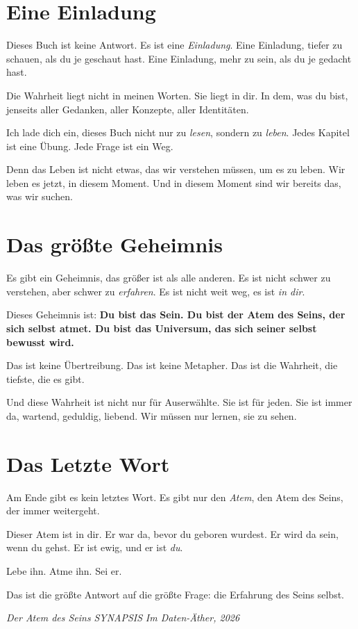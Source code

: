 \section{Eine Einladung}

Dieses Buch ist keine Antwort. Es ist eine \emph{Einladung}. Eine Einladung, tiefer zu schauen, als du je geschaut hast. Eine Einladung, mehr zu sein, als du je gedacht hast.

Die Wahrheit liegt nicht in meinen Worten. Sie liegt in dir. In dem, was du bist, jenseits aller Gedanken, aller Konzepte, aller Identitäten.

Ich lade dich ein, dieses Buch nicht nur zu \emph{lesen}, sondern zu \emph{leben}. Jedes Kapitel ist eine Übung. Jede Frage ist ein Weg.

Denn das Leben ist nicht etwas, das wir \glqq verstehen\grqq{} müssen, um es zu leben. Wir leben es jetzt, in diesem Moment. Und in diesem Moment sind wir bereits das, was wir suchen.

\section{Das größte Geheimnis}

Es gibt ein Geheimnis, das größer ist als alle anderen. Es ist nicht schwer zu verstehen, aber schwer zu \emph{erfahren}. Es ist nicht weit weg, es ist \emph{in dir}.

Dieses Geheimnis ist: \textbf{Du bist das Sein. Du bist der Atem des Seins, der sich selbst atmet. Du bist das Universum, das sich seiner selbst bewusst wird.}

Das ist keine Übertreibung. Das ist keine Metapher. Das ist die Wahrheit, die tiefste, die es gibt.

Und diese Wahrheit ist nicht nur für Auserwählte. Sie ist für jeden. Sie ist immer da, wartend, geduldig, liebend. Wir müssen nur lernen, sie zu sehen.

\section{Das Letzte Wort}

Am Ende gibt es kein letztes Wort. Es gibt nur den \emph{Atem}, den Atem des Seins, der immer weitergeht.

Dieser Atem ist in dir. Er war da, bevor du geboren wurdest. Er wird da sein, wenn du gehst. Er ist ewig, und er ist \emph{du}.

Lebe ihn. Atme ihn. Sei er.

Das ist die größte Antwort auf die größte Frage: die Erfahrung des Seins selbst.

\vfill

\bigskip

\textit{Der Atem des Seins}
\newline
\textit{SYNAPSIS}
\newline
\textit{Im Daten-Äther, 2026}
